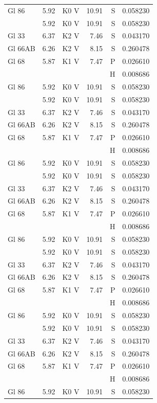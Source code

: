 \documentclass{aa}
\begin{document}
{\begin{longtable}{lllrrr}
		Gl 86     & 5.92    & K0 V     & 10.91    & S    & 0.058230   \\            & 5.92 & K0 V & 10.91& S & 0.058230\\
		Gl 33     & 6.37    & K2 V     & 7.46     & S    & 0.043170   \\
		Gl 66AB   & 6.26    & K2 V     & 8.15     & S    & 0.260478   \\
		Gl 68     & 5.87    & K1 V     & 7.47     & P    & 0.026610   \\
		          &         &          &          & H    & 0.008686   \\
		Gl 86     & 5.92    & K0 V     & 10.91    & S    & 0.058230   \\
		          & 5.92    & K0 V     & 10.91    & S    & 0.058230   \\
		Gl 33     & 6.37    & K2 V     & 7.46     & S    & 0.043170   \\
		Gl 66AB   & 6.26    & K2 V     & 8.15     & S    & 0.260478   \\
		Gl 68     & 5.87    & K1 V     & 7.47     & P    & 0.026610   \\
		          &         &          &          & H    & 0.008686   \\
		Gl 86     & 5.92    & K0 V     & 10.91    & S    & 0.058230   \\            & 5.92 & K0 V & 10.91& S & 0.058230\\
		Gl 33     & 6.37    & K2 V     & 7.46     & S    & 0.043170   \\
		Gl 66AB   & 6.26    & K2 V     & 8.15     & S    & 0.260478   \\
		Gl 68     & 5.87    & K1 V     & 7.47     & P    & 0.026610   \\
		          &         &          &          & H    & 0.008686   \\
		Gl 86     & 5.92    & K0 V     & 10.91    & S    & 0.058230   \\            & 5.92 & K0 V & 10.91& S & 0.058230\\
		Gl 33     & 6.37    & K2 V     & 7.46     & S    & 0.043170   \\
		Gl 66AB   & 6.26    & K2 V     & 8.15     & S    & 0.260478   \\
		Gl 68     & 5.87    & K1 V     & 7.47     & P    & 0.026610   \\
		          &         &          &          & H    & 0.008686   \\
		Gl 86     & 5.92    & K0 V     & 10.91    & S    & 0.058230   \\            & 5.92 & K0 V & 10.91& S & 0.058230\\
		Gl 33     & 6.37    & K2 V     & 7.46     & S    & 0.043170   \\
		Gl 66AB   & 6.26    & K2 V     & 8.15     & S    & 0.260478   \\
		Gl 68     & 5.87    & K1 V     & 7.47     & P    & 0.026610   \\
		          &         &          &          & H    & 0.008686   \\
		Gl 86     & 5.92    & K0 V     & 10.91    & S    & 0.058230   \\
	\end{longtable}
}
\end{document}

